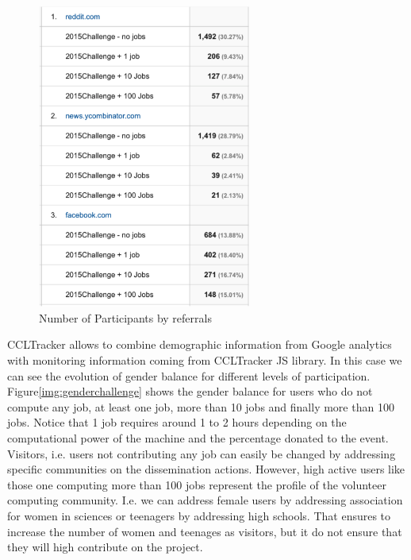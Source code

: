 \documentclass{article}
\begin{document}
\begin{figure}[t]
  \begin{center}
		\includegraphics[width=7cm]{imgs/usersbyreferrals.png}
  \end{center}
\caption{Number of Participants by referrals}
\label{img:usersbyreferrals}
\end{figure}



CCLTracker allows to combine demographic information from Google analytics with monitoring information coming from CCLTracker JS library. In this case we can see the evolution of gender balance for different levels of participation. Figure\ref{img:genderchallenge} shows the gender balance for users who do not compute any job, at least one job,  more than 10 jobs and finally more than 100 jobs. Notice that 1 job requires around 1 to 2 hours depending on the computational power of the machine and the percentage donated to the event. Visitors, i.e. users not contributing any job can easily be changed by addressing specific communities on the dissemination actions. However, high active users like those one computing more than 100 jobs represent the profile of the volunteer computing community. I.e. we can address female users by addressing association for women in sciences or teenagers by addressing high schools. That ensures to increase the number of women and teenages as visitors, but it do not ensure that they will high contribute on the project. 
\end{document}
